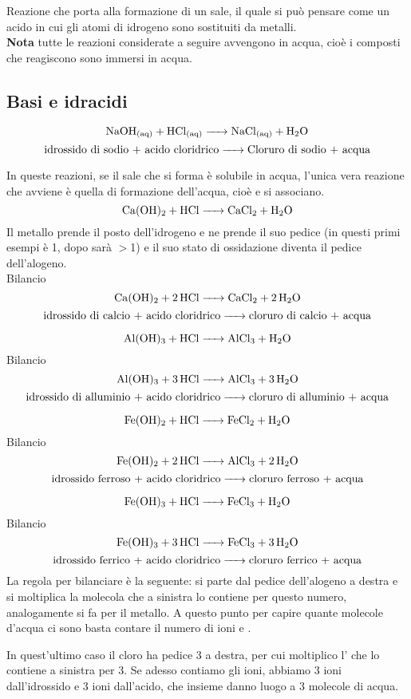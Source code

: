 Reazione che porta alla formazione di un sale, il quale si può pensare come un acido in cui gli atomi di idrogeno sono sostituiti da metalli.\\
\textbf{Nota} tutte le reazioni considerate a seguire avvengono in acqua, cioè i composti che reagiscono sono immersi in acqua.
\subsection{Basi e idracidi}
$$\ce{NaOH_{(aq)} + HCl_{(aq)} -> NaCl_{(aq)} + H_2O}$$
$$\text{idrossido di sodio + acido cloridrico} \ce{->} \text{Cloruro di sodio + acqua}$$

In queste reazioni, se il sale che si forma è solubile in  acqua, l'unica vera reazione che avviene è quella di formazione dell'acqua, cioè  e  si associano.
$$\ce{Ca(OH)_2 + HCl -> CaCl_2 + H_2O}$$
Il metallo prende il posto dell'idrogeno e ne prende il suo pedice (in questi primi esempi è 1, dopo sarà $>$1) e il suo stato di ossidazione diventa il pedice dell'alogeno.
\\Bilancio
$$\ce{Ca(OH)_2 + 2 HCl -> CaCl_2 + 2 H_2O}$$
$$\text{idrossido di calcio + acido cloridrico} \ce{->} \text{cloruro di calcio + acqua}$$

$$\ce{Al(OH)_3 + HCl -> AlCl_3 + H_2O}$$
Bilancio
$$\ce{Al(OH)_3 + 3 HCl -> AlCl_3 + 3 H_2O}$$
$$\text{idrossido di alluminio + acido cloridrico} \ce{->} \text{cloruro di alluminio + acqua}$$

$$\ce{Fe(OH)_2 + HCl -> FeCl_2 + H_2O}$$
Bilancio
$$\ce{Fe(OH)_2 + 2 HCl -> AlCl_3 + 2 H_2O}$$
$$\text{idrossido ferroso + acido cloridrico} \ce{->} \text{cloruro ferroso + acqua}$$

$$\ce{Fe(OH)_3 + HCl -> FeCl_3 + H_2O}$$
Bilancio
$$\ce{Fe(OH)_3 + 3 HCl -> FeCl_3 + 3 H_2O}$$
$$\text{idrossido ferrico + acido cloridrico} \ce{->} \text{cloruro ferrico + acqua}$$
La regola per bilanciare è la seguente: si parte dal pedice dell'alogeno a destra e si moltiplica la molecola che a sinistra lo contiene per questo numero, analogamente si fa per il metallo. A questo punto per capire quante molecole d'acqua ci sono basta contare il numero di ioni  e .

In quest'ultimo caso il cloro ha pedice 3 a destra, per cui moltiplico l' che lo contiene a sinistra per 3. Se adesso contiamo gli ioni, abbiamo 3 ioni  dall'idrossido e 3 ioni  dall'acido, che insieme danno luogo a 3 molecole di acqua.
